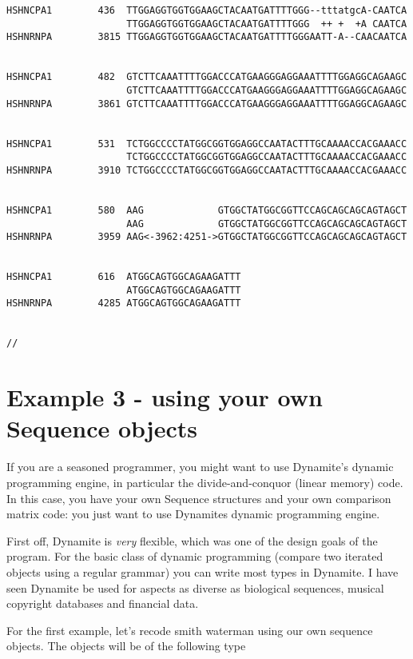 \begin{verbatim}
HSHNCPA1        436  TTGGAGGTGGTGGAAGCTACAATGATTTTGGG--tttatgcA-CAATCA 
                     TTGGAGGTGGTGGAAGCTACAATGATTTTGGG  ++ +  +A CAATCA 
HSHNRNPA        3815 TTGGAGGTGGTGGAAGCTACAATGATTTTGGGAATT-A--CAACAATCA 


HSHNCPA1        482  GTCTTCAAATTTTGGACCCATGAAGGGAGGAAATTTTGGAGGCAGAAGC 
                     GTCTTCAAATTTTGGACCCATGAAGGGAGGAAATTTTGGAGGCAGAAGC 
HSHNRNPA        3861 GTCTTCAAATTTTGGACCCATGAAGGGAGGAAATTTTGGAGGCAGAAGC 


HSHNCPA1        531  TCTGGCCCCTATGGCGGTGGAGGCCAATACTTTGCAAAACCACGAAACC 
                     TCTGGCCCCTATGGCGGTGGAGGCCAATACTTTGCAAAACCACGAAACC 
HSHNRNPA        3910 TCTGGCCCCTATGGCGGTGGAGGCCAATACTTTGCAAAACCACGAAACC 


HSHNCPA1        580  AAG             GTGGCTATGGCGGTTCCAGCAGCAGCAGTAGCT 
                     AAG             GTGGCTATGGCGGTTCCAGCAGCAGCAGTAGCT 
HSHNRNPA        3959 AAG<-3962:4251->GTGGCTATGGCGGTTCCAGCAGCAGCAGTAGCT 


HSHNCPA1        616  ATGGCAGTGGCAGAAGATTT                              
                     ATGGCAGTGGCAGAAGATTT                              
HSHNRNPA        4285 ATGGCAGTGGCAGAAGATTT                              


//

\end{verbatim}

\section{Example 3 - using your own Sequence objects}
\label{own_objects}

If you are a seasoned programmer, you might want to use Dynamite's
dynamic programming engine, in particular the divide-and-conquor
(linear memory) code. In this case, you have your own Sequence structures
and your own comparison matrix code: you just want to use Dynamites
dynamic programming engine.

First off, Dynamite is \emph{very} flexible, which was one of the design
goals of the program. For the basic class of dynamic programming (compare
two iterated objects using a regular grammar) you can write most types
in Dynamite. I have seen Dynamite be used for aspects as diverse as 
biological sequences, musical copyright databases and financial data.

For the first example, let's recode smith waterman using our own sequence
objects. The objects will be of the following type

